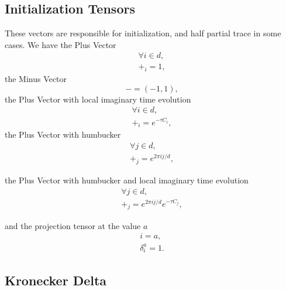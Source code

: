 \subsection{Initialization Tensors}
These vectors are responsible for initialization, and half partial trace in some cases. We have the Plus Vector
\begin{equation}
    \begin{gathered}
        \forall i\in d,\\
        +_{i} = 1,
    \end{gathered}
\end{equation}
the Minus Vector
\begin{equation}
        - = (-1,1),
\end{equation}
the Plus Vector with local imaginary time evolution
\begin{equation}
    \begin{gathered}
        \forall i\in d,\\
        +_{i} = e^{-\tau C_i},
    \end{gathered}
\end{equation}
the Plus Vector with humbucker
\begin{equation}
    \begin{gathered}
        \forall j\in d,\\
        +_{j} = e^{2\pi i j/d},
    \end{gathered}
\end{equation}

the Plus Vector with humbucker and local imaginary time evolution
\begin{equation}
    \begin{gathered}
        \forall j\in d,\\
        +_{j} = e^{2\pi i j/d}e^{-\tau C_j},
    \end{gathered}
\end{equation}

and the projection tensor at the value $a$
\begin{equation}
    \begin{gathered}
        i=a,\\
        \delta^{a}_{i} = 1.
    \end{gathered}
\end{equation}


\subsection{Kronecker Delta}

